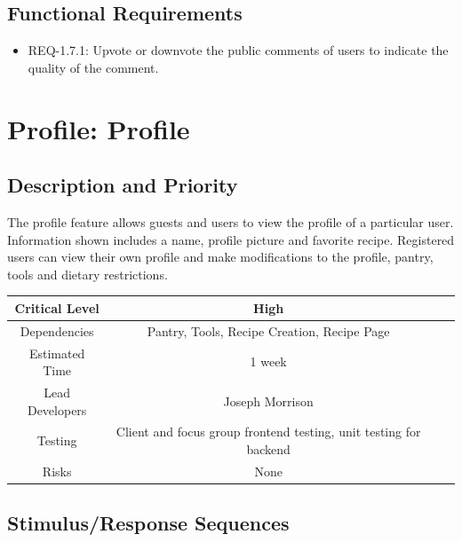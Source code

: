 \documentclass{scrreprt}
\begin{document}
\subsection{\gls{Functional Requirements}}

\begin{itemize}
    \item REQ-1.7.1: Upvote or downvote the public comments of users to indicate the quality of the comment.
\end{itemize}

\section{Profile: Profile}

\subsection{Description and Priority}

The profile feature allows guests and users to view the profile of a particular user. Information shown includes a name, profile picture and favorite recipe. Registered users can view their own profile and make modifications to the profile, pantry, tools and dietary restrictions.

\begin{center}
    \begin{tabular}{| c | c | c | c |}
        \hline
        Critical Level  & High                                                                 \\
        \hline
        Dependencies    & Pantry, Tools, Recipe Creation, Recipe Page                          \\
        \hline
        Estimated Time  & 1 week                                                               \\
        \hline
        Lead Developers & Joseph Morrison \\
        \hline
        Testing         & Client and focus group \gls{frontend} testing,
                          \gls{unit testing} for \gls{backend}                                 \\
        \hline
        Risks           & None                                                                 \\
        \hline
    \end{tabular}
\end{center}

\subsection{Stimulus/Response Sequences}
\end{document}

